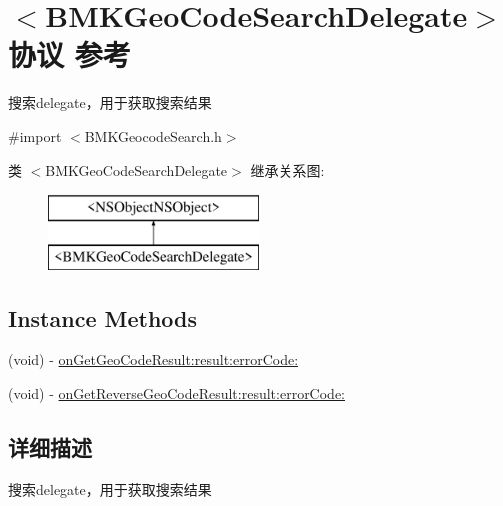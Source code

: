 \hypertarget{protocol_b_m_k_geo_code_search_delegate-p}{\section{$<$B\+M\+K\+Geo\+Code\+Search\+Delegate$>$协议 参考}
\label{protocol_b_m_k_geo_code_search_delegate-p}
}


搜索delegate，用于获取搜索结果  




{\ttfamily \#import $<$B\+M\+K\+Geocode\+Search.\+h$>$}

类 $<$B\+M\+K\+Geo\+Code\+Search\+Delegate$>$ 继承关系图\+:\begin{figure}[H]
\begin{center}
\leavevmode
\includegraphics[height=2.000000cm]{protocol_b_m_k_geo_code_search_delegate-p}
\end{center}
\end{figure}
\subsection*{Instance Methods}
\begin{DoxyCompactItemize}
\item 
(void) -\/ \hyperlink{protocol_b_m_k_geo_code_search_delegate-p_ac50237b58058d88d46ad0a4c99208382}{on\+Get\+Geo\+Code\+Result\+:result\+:error\+Code\+:}
\item 
(void) -\/ \hyperlink{protocol_b_m_k_geo_code_search_delegate-p_a8b9139623a45d9366e38bd000c1369c0}{on\+Get\+Reverse\+Geo\+Code\+Result\+:result\+:error\+Code\+:}
\end{DoxyCompactItemize}


\subsection{详细描述}
搜索delegate，用于获取搜索结果 

